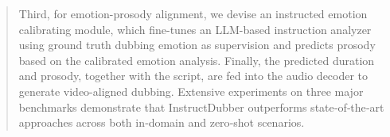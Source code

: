 \begin{abstract}
Third, for emotion-prosody alignment, we devise an instructed emotion calibrating module, which fine-tunes an LLM-based instruction analyzer using ground truth dubbing emotion as supervision and predicts prosody based on the calibrated emotion analysis.
Finally, the predicted duration and prosody, together with the script, are fed into the audio decoder to generate video-aligned dubbing. 
Extensive experiments on three major benchmarks demonstrate that InstructDubber outperforms state‑of‑the‑art approaches across both in‑domain and zero‑shot scenarios.
\end{abstract}